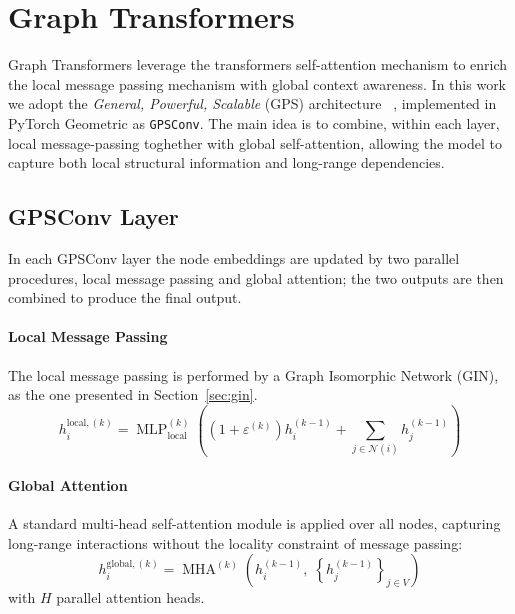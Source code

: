 \section{Graph Transformers}
\label{sec:gps}

Graph Transformers leverage the transformers self-attention mechanism to enrich the local message passing mechanism with global context awareness. 
In this work we adopt the \emph{General, Powerful, Scalable} (GPS) architecture ~\cite{rampasek2022gps}, implemented in PyTorch Geometric as \texttt{GPSConv}.
The main idea is to combine, within each layer, local message-passing toghether with global self-attention, allowing the model to capture both local structural information and long-range dependencies.

\subsection{GPSConv Layer}
In each GPSConv layer the node embeddings are updated by two parallel procedures, local message passing and global attention; the two outputs are then combined to produce the final output. 

\paragraph{Local Message Passing}
The local message passing is performed by a Graph Isomorphic Network (GIN), as the one presented in Section~\ref{sec:gin}.
\begin{equation}
  h_i^{\text{local},(k)} = \operatorname{MLP}_{\text{local}}^{(k)}\!\left(
    \left(1 + \varepsilon^{(k)}\right) h_i^{(k-1)}
    + \sum_{j \in \mathcal{N}(i)} h_j^{(k-1)}
  \right)
\end{equation}

\paragraph{Global Attention}
A standard multi-head self-attention module is applied over all nodes, capturing long-range interactions without the locality constraint of message passing:
\begin{equation}
  h_i^{\text{global},(k)} = \operatorname{MHA}^{(k)}\!\left(
    h_i^{(k-1)},\;\left\{h_j^{(k-1)}\right\}_{j \in V}
  \right)
\end{equation}
with $H$ parallel attention heads.
\bigskip

